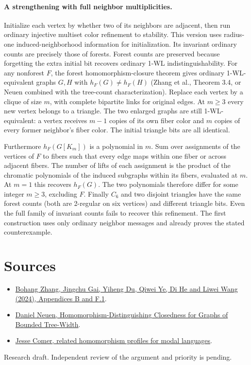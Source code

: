 \documentclass[10pt]{article}
\begin{document}
\paragraph{A strengthening with full neighbor multiplicities.} Initialize each vertex by whether two of its neighbors are adjacent, then run ordinary injective multiset color refinement to stability. This version uses radius-one induced-neighborhood information for initialization. Its invariant ordinary counts are precisely those of forests. Forest counts are preserved because forgetting the extra initial bit recovers ordinary 1-WL indistinguishability. For any nonforest $F$, the forest homomorphism-closure theorem gives ordinary 1-WL-equivalent graphs $G,H$ with $h_F(G)\ne h_F(H)$ (Zhang et al., Theorem 3.4, or Neuen combined with the tree-count characterization). Replace each vertex by a clique of size $m$, with complete bipartite links for original edges. At $m\ge3$ every new vertex belongs to a triangle. The two enlarged graphs are still 1-WL-equivalent: a vertex receives $m-1$ copies of its own fiber color and $m$ copies of every former neighbor's fiber color. The initial triangle bits are all identical.

Furthermore $h_F(G[K_m])$ is a polynomial in $m$. Sum over assignments of the vertices of $F$ to fibers such that every edge maps within one fiber or across adjacent fibers. The number of lifts of each assignment is the product of the chromatic polynomials of the induced subgraphs within its fibers, evaluated at $m$. At $m=1$ this recovers $h_F(G)$. The two polynomials therefore differ for some integer $m\ge3$, excluding $F$. Finally $C_6$ and two disjoint triangles have the same forest counts (both are 2-regular on six vertices) and different triangle bits. Even the full family of invariant counts fails to recover this refinement. The first construction uses only ordinary neighbor messages and already proves the stated counterexample.

\section*{Sources}
\begin{itemize}
\item \href{https://proceedings.iclr.cc/paper_files/paper/2024/hash/ec702dd6e83b2113a43614685a7e2ac6-Abstract-Conference.html}{Bohang Zhang, Jingchu Gai, Yiheng Du, Qiwei Ye, Di He and Liwei Wang (2024), Appendices B and F.1}.
\item \href{https://arxiv.org/abs/2304.07011}{Daniel Neuen, Homomorphism-Distinguishing Closedness for Graphs of Bounded Tree-Width}.
\item \href{https://arxiv.org/abs/2404.15421}{Jesse Comer, related homomorphism profiles for modal languages}.
\end{itemize}
{\small Research draft. Independent review of the argument and priority is pending.}
\end{document}
